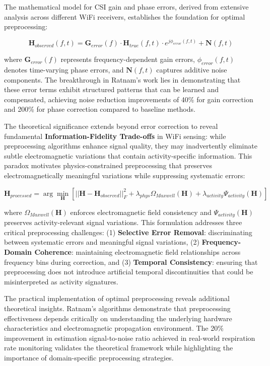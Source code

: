 \documentclass[journal]{IEEEtran}
\begin{document}
The mathematical model for CSI gain and phase errors, derived from extensive analysis across different WiFi receivers, establishes the foundation for optimal preprocessing:

\begin{equation}
\mathbf{H}_{observed}(f,t) = \mathbf{G}_{error}(f) \cdot \mathbf{H}_{true}(f,t) \cdot e^{j\phi_{error}(f,t)} + \mathbf{N}(f,t)
\label{eq:csi_error_model}
\end{equation}

where $\mathbf{G}_{error}(f)$ represents frequency-dependent gain errors, $\phi_{error}(f,t)$ denotes time-varying phase errors, and $\mathbf{N}(f,t)$ captures additive noise components. The breakthrough in Ratnam's work lies in demonstrating that these error terms exhibit structured patterns that can be learned and compensated, achieving noise reduction improvements of 40\% for gain correction and 200\% for phase correction compared to baseline methods.

The theoretical significance extends beyond error correction to reveal fundamental \textbf{Information-Fidelity Trade-offs} in WiFi sensing: while preprocessing algorithms enhance signal quality, they may inadvertently eliminate subtle electromagnetic variations that contain activity-specific information. This paradox motivates physics-constrained preprocessing that preserves electromagnetically meaningful variations while suppressing systematic errors:

\begin{equation}
\mathbf{H}_{processed} = \arg\min_{\mathbf{H}} \left[ ||\mathbf{H} - \mathbf{H}_{observed}||_F^2 + \lambda_{phys} \Omega_{Maxwell}(\mathbf{H}) + \lambda_{activity} \Psi_{activity}(\mathbf{H}) \right]
\label{eq:physics_preprocessing}
\end{equation}

where $\Omega_{Maxwell}(\mathbf{H})$ enforces electromagnetic field consistency and $\Psi_{activity}(\mathbf{H})$ preserves activity-relevant signal variations. This formulation addresses three critical preprocessing challenges: (1) \textbf{Selective Error Removal}: discriminating between systematic errors and meaningful signal variations, (2) \textbf{Frequency-Domain Coherence}: maintaining electromagnetic field relationships across frequency bins during correction, and (3) \textbf{Temporal Consistency}: ensuring that preprocessing does not introduce artificial temporal discontinuities that could be misinterpreted as activity signatures.

The practical implementation of optimal preprocessing reveals additional theoretical insights. Ratnam's algorithms demonstrate that preprocessing effectiveness depends critically on understanding the underlying hardware characteristics and electromagnetic propagation environment. The 20\% improvement in estimation signal-to-noise ratio achieved in real-world respiration rate monitoring validates the theoretical framework while highlighting the importance of domain-specific preprocessing strategies.
\end{document}
